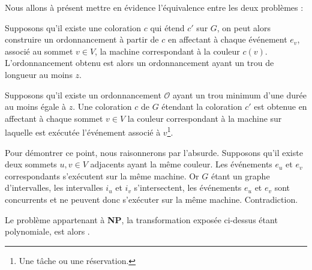 \documentclass[a4paper,9pt]{report}
\begin{document}
Nous allons à présent mettre en évidence l'équivalence entre les deux problèmes :
\begin{bitemize}
    \item Supposons qu'il existe une coloration $c$ qui étend $c'$ sur $G$, on peut alors
        construire un ordonnancement à partir de $c$ en affectant à chaque événement $e_v$,
        associé au sommet $v \in V$, la machine correspondant à la couleur $c(v)$.
        L'ordonnancement obtenu est alors un ordonnancement ayant un trou de longueur au moins
        $z$.

    \item Supposons qu'il existe un ordonnancement $\mathcal{O}$ ayant un trou minimum d'une durée au
        moins égale à $z$. Une coloration $c$ de $G$ étendant la coloration $c'$ est obtenue en
        affectant à chaque sommet $v \in V$ la couleur correspondant à la machine
        sur laquelle est exécutée l'événement associé à $v$\footnote{Une tâche ou une
        réservation.}.
        
        Pour démontrer ce point, nous raisonnerons par l'absurde. Supposons qu'il existe deux
        sommets $u, v \in V$ adjacents ayant la même couleur. Les événements $e_u$ et $e_v$
        correspondants s'exécutent sur la même machine. Or $G$ étant un graphe d'intervalles,
        les intervalles $i_u$ et $i_v$ s'intersectent, les événements $e_u$ et $e_v$ sont
        concurrents et ne peuvent donc s'exécuter sur la même machine. Contradiction.


\end{bitemize}

Le problème \fischedpi appartenant à \textbf{NP}, la
transformation exposée ci-dessus étant polynomiale, \fischedpi est alors \npc.
\end{document}
